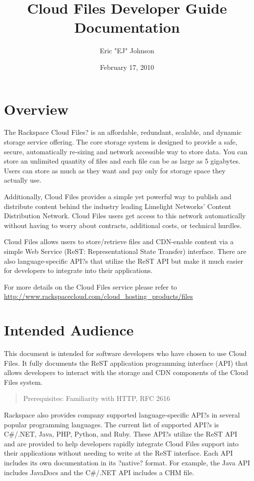 \documentclass[letterpaper,10pt,english]{manual}
\title{Cloud Files Developer Guide Documentation}
\date{February 17, 2010}
\author{Eric "EJ" Johnson}
\begin{document}
\maketitle
\tableofcontents




\chapter{Overview}

The Rackspace Cloud Files? is an affordable, redundant, scalable, and
dynamic storage service offering.  The core storage system is designed to
provide a safe, secure, automatically re-sizing and network accessible way
to store data.  You can store an unlimited quantity of files and each file
can be as large as 5 gigabytes. Users can store as much as they want and
pay only for storage space they actually use.

Additionally, Cloud Files provides a simple yet powerful way to publish
and distribute content behind the industry leading Limelight Networks'
Content Distribution Network. Cloud Files users get access to this
network automatically without having to worry about contracts, additional
costs, or technical hurdles.

Cloud Files allows users to store/retrieve files and CDN-enable content
via a simple Web Service (ReST: Representational State Transfer)
interface. There are also language-specific API?s that utilize the ReST
API but make it much easier for developers to integrate into their
applications.

For more details on the Cloud Files service please refer to
\href{http://www.rackspacecloud.com/cloud\_hosting\_products/files}{http://www.rackspacecloud.com/cloud\_hosting\_products/files}


\chapter{Intended Audience}

This document is intended for software developers who have chosen to use
Cloud Files. It fully documents the ReST application programming interface
(API) that allows developers to interact with the storage and CDN
components of the Cloud Files system.
\begin{quote}

Prerequisites: Familiarity with HTTP, RFC 2616
\end{quote}

Rackspace also provides company supported language-specific API?s in
several popular programming languages.  The current list of supported
API?s is C\#/.NET, Java, PHP, Python, and Ruby.  These API?s utilize the
ReST API and are provided to help developers rapidly integrate Cloud Files
support into their applications without needing to write at the ReST
interface.  Each API includes its own documentation in its ?native?
format.  For example, the Java API includes JavaDocs and the C\#/.NET API
includes a CHM file.
\end{document}
